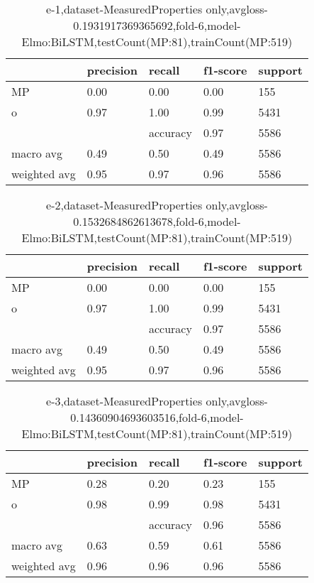 \begin{table}[!ht] 
\centering
\caption{e-1,dataset-MeasuredProperties only,avgloss-0.1931917369365692,fold-6,model-Elmo:BiLSTM,testCount(MP:81),trainCount(MP:519)}\label{e-1data-mpS.tsv}
\begin{tabularx}{300pt}{|X|X|X|X|X|}
\hline
&precision&recall&f1-score&support\\
\hline
MP&0.00&0.00&0.00&155\\
\hline
o&0.97&1.00&0.99&5431\\
\hline
&&accuracy&0.97&5586\\
\hline
macro avg&0.49&0.50&0.49&5586\\
\hline
weighted avg&0.95&0.97&0.96&5586\\
\hline
\end{tabularx}
\end{table}
\begin{table}[!ht] 
\centering
\caption{e-2,dataset-MeasuredProperties only,avgloss-0.1532684862613678,fold-6,model-Elmo:BiLSTM,testCount(MP:81),trainCount(MP:519)}\label{e-2data-mpS.tsv}
\begin{tabularx}{300pt}{|X|X|X|X|X|}
\hline
&precision&recall&f1-score&support\\
\hline
MP&0.00&0.00&0.00&155\\
\hline
o&0.97&1.00&0.99&5431\\
\hline
&&accuracy&0.97&5586\\
\hline
macro avg&0.49&0.50&0.49&5586\\
\hline
weighted avg&0.95&0.97&0.96&5586\\
\hline
\end{tabularx}
\end{table}
\begin{table}[!ht] 
\centering
\caption{e-3,dataset-MeasuredProperties only,avgloss-0.14360904693603516,fold-6,model-Elmo:BiLSTM,testCount(MP:81),trainCount(MP:519)}\label{e-3data-mpS.tsv}
\begin{tabularx}{300pt}{|X|X|X|X|X|}
\hline
&precision&recall&f1-score&support\\
\hline
MP&0.28&0.20&0.23&155\\
\hline
o&0.98&0.99&0.98&5431\\
\hline
&&accuracy&0.96&5586\\
\hline
macro avg&0.63&0.59&0.61&5586\\
\hline
weighted avg&0.96&0.96&0.96&5586\\
\hline
\end{tabularx}
\end{table}
